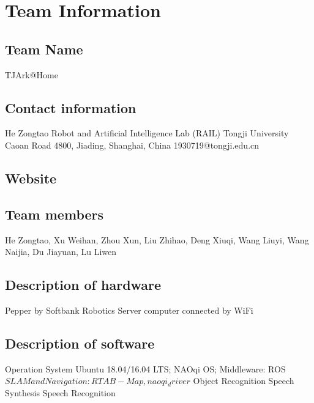 \section{Team Information}
\label{sec:team}

\subsection*{Team Name}
TJArk@Home

\subsection*{Contact information}
He Zongtao
Robot and Artificial Intelligence Lab (RAIL)
Tongji University
Caoan Road 4800, Jiading, Shanghai, China
1930719@tongji.edu.cn

\subsection*{Website}

\subsection*{Team members}
He Zongtao, Xu Weihan, Zhou Xun, Liu Zhihao, Deng Xiuqi, Wang Liuyi, Wang Naijia, Du Jiayuan, Lu Liwen

\subsection*{Description of hardware}
Pepper by Softbank Robotics
Server computer connected by WiFi

\subsection*{Description of software}
Operation System Ubuntu 18.04/16.04 LTS; NAOqi OS;
Middleware: ROS
$SLAM and Navigation: RTAB-Map, naoqi_driver$
Object Recognition
Speech Synthesis
Speech Recognition
